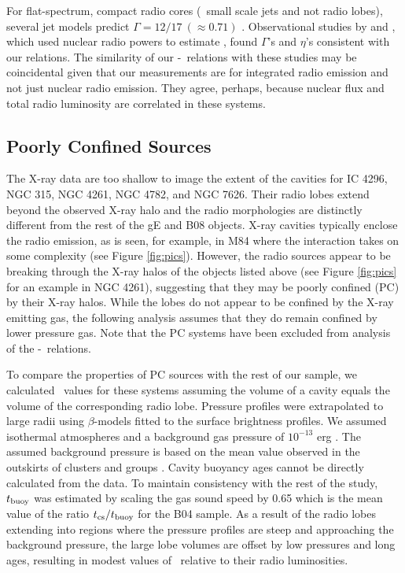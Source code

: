 \documentclass[12pt, preprint]{aastex}
\begin{document}
For flat-spectrum, compact radio cores (\ie\ small scale jets and not
radio lobes), several jet models predict $\Gamma = 12/17 ~(\approx
0.71)$ \citep{1979ApJ...232...34B, 1995A&A...293..665F,
  2003MNRAS.343L..59H}. Observational studies by
\citet{2005ApJ...633..384H} and \citet{2007MNRAS.381..589M}, which
used nuclear radio powers to estimate \pjet, found $\Gamma$'s and
$\eta$'s consistent with our relations. The similarity of our
\pjet-\prad\ relations with these studies may be coincidental given
that our measurements are for integrated radio emission and not just
nuclear radio emission. They agree, perhaps, because nuclear flux and
total radio luminosity are correlated in these systems.

\subsection{Poorly Confined Sources}
\label{sec:jet}

The X-ray data are too shallow to image the extent of the cavities for
IC 4296, NGC 315, NGC 4261, NGC 4782, and NGC 7626. Their radio lobes
extend beyond the observed X-ray halo and the radio morphologies are
distinctly different from the rest of the gE and B08 objects. X-ray
cavities typically enclose the radio emission, as is seen, for
example, in M84 \citep{2001ApJ...547L.107F, 2008ApJ...686..911F} where
the interaction takes on some complexity (see Figure
\ref{fig:pics}). However, the radio sources appear to be breaking
through the X-ray halos of the objects listed above (see Figure
\ref{fig:pics} for an example in NGC 4261), suggesting that they may
be poorly confined (PC) by their X-ray halos. While the lobes do not
appear to be confined by the X-ray emitting gas, the following
analysis assumes that they do remain confined by lower pressure
gas. Note that the PC systems have been excluded from analysis of the
\pjet-\prad\ relations.

To compare the properties of PC sources with the rest of our sample,
we calculated \pcav\ values for these systems assuming the volume of a
cavity equals the volume of the corresponding radio lobe. Pressure
profiles were extrapolated to large radii using $\beta$-models
\citep{betamodel} fitted to the surface brightness profiles. We
assumed isothermal atmospheres and a background gas pressure of
$10^{-13}$ erg \pcc. The assumed background pressure is based on the
mean value observed in the outskirts of clusters and groups
\citep{accept}. Cavity buoyancy ages cannot be directly calculated
from the data. To maintain consistency with the rest of the study,
$t_{\rm{buoy}}$ was estimated by scaling the gas sound speed by 0.65
which is the mean value of the ratio $t_{\rm{cs}}/t_{\rm{buoy}}$ for
the B04 sample. As a result of the radio lobes extending into regions
where the pressure profiles are steep and approaching the background
pressure, the large lobe volumes are offset by low pressures and long
ages, resulting in modest values of \pcav\ relative to their radio
luminosities.
\end{document}
